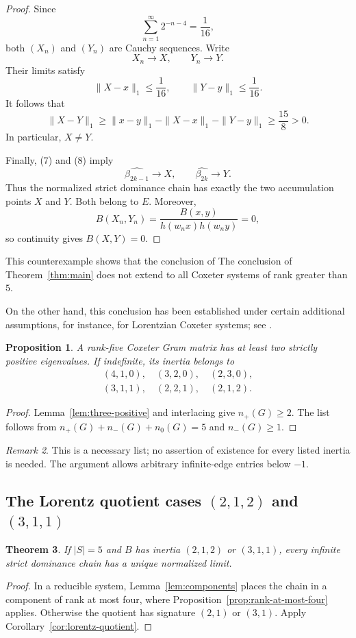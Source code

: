 \documentclass[11pt,reqno]{amsart}
\theoremstyle{plain}
\newtheorem{theorem}{Theorem}[section]
\newtheorem{proposition}[theorem]{Proposition}
\theoremstyle{definition}
\theoremstyle{remark}
\newtheorem{remark}[theorem]{Remark}
\numberwithin{equation}{section}
\begin{document}
\begin{proof}
Since
\[
\sum_{n=1}^{\infty}2^{-n-4}=\frac1{16},
\]
both $(X_n)$ and $(Y_n)$ are Cauchy sequences. Write
\[
X_n\longrightarrow X,\qquad Y_n\longrightarrow Y.
\]
Their limits satisfy
\[
\|X-x\|_1\leq\frac1{16},
\qquad
\|Y-y\|_1\leq\frac1{16}.
\]
It follows that
\[
\|X-Y\|_1
\geq\|x-y\|_1-\|X-x\|_1-\|Y-y\|_1
\geq\frac{15}{8}>0.
\]
In particular, $X\neq Y$.

Finally, (7) and (8) imply
\[
\widehat{\beta_{2k-1}}\longrightarrow X,
\qquad
\widehat{\beta_{2k}}\longrightarrow Y.
\]
Thus the normalized strict dominance chain has exactly the two
accumulation points $X$ and $Y$. Both belong to $E$. Moreover,
\[
B(X_n,Y_n)
=\frac{B(x,y)}{h(w_nx)h(w_ny)}=0,
\]
so continuity gives $B(X,Y)=0$.
\end{proof}
This counterexample shows that the conclusion of
The conclusion of Theorem~\ref{thm:main} does not extend to all Coxeter systems
of rank greater than $5$.

On the other hand, this conclusion has been established
under certain additional assumptions, for instance,
for Lorentzian Coxeter systems; see \cite{ChenLabbe2017}.
\begin{proposition}
A rank-five Coxeter Gram matrix has at least two strictly positive eigenvalues. If indefinite, its inertia belongs to
\[
\begin{gathered}
(4,1,0),\quad(3,2,0),\quad(2,3,0),\\
(3,1,1),\quad(2,2,1),\quad(2,1,2).
\end{gathered}
\]
\end{proposition}
\begin{proof}
Lemma~\ref{lem:three-positive} and interlacing give $n_+(G)\geq2$. The list follows from $n_+(G)+n_-(G)+n_0(G)=5$ and $n_-(G)\geq1$.
\end{proof}

\begin{remark}
This is a necessary list; no assertion of existence for every listed inertia is needed. The argument allows arbitrary infinite-edge entries below $-1$.
\end{remark}

\subsection{The Lorentz quotient cases \texorpdfstring{$(2,1,2)$ and $(3,1,1)$}{(2,1,2) and (3,1,1)}}

\begin{theorem}\label{thm:rank5-lorentz-quotients}
If $|S|=5$ and $B$ has inertia $(2,1,2)$ or $(3,1,1)$, every infinite strict dominance chain has a unique normalized limit.
\end{theorem}
\begin{proof}
In a reducible system, Lemma~\ref{lem:components} places the chain in a component of rank at most four, where Proposition~\ref{prop:rank-at-most-four} applies. Otherwise the quotient has signature $(2,1)$ or $(3,1)$. Apply Corollary~\ref{cor:lorentz-quotient}.
\end{proof}
\end{document}
